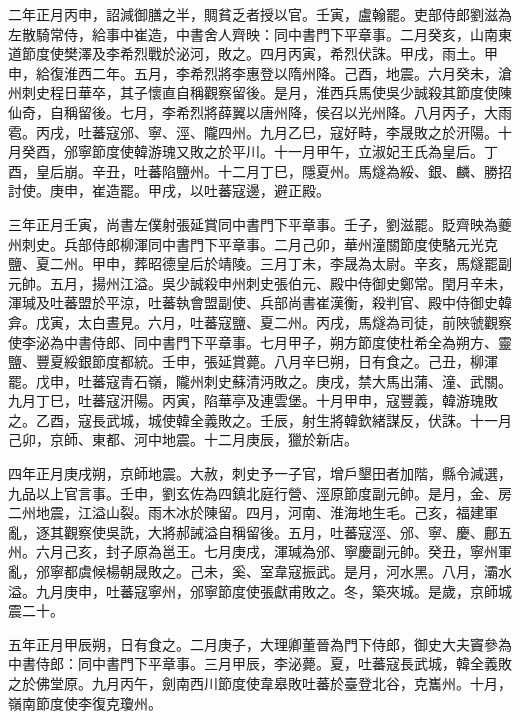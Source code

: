\begin{pinyinscope}
 二年正月丙申，詔減御膳之半，賙貧乏者授以官。壬寅，盧翰罷。吏部侍郎劉滋為左散騎常侍，給事中崔造，中書舍人齊映：同中書門下平章事。二月癸亥，山南東道節度使樊澤及李希烈戰於泌河，敗之。四月丙寅，希烈伏誅。甲戌，雨土。甲申，給復淮西二年。五月，李希烈將李惠登以隋州降。己酉，地震。六月癸未，滄州刺史程日華卒，其子懷直自稱觀察留後。是月，淮西兵馬使吳少誠殺其節度使陳仙奇，自稱留後。七月，李希烈將薛翼以唐州降，侯召以光州降。八月丙子，大雨雹。丙戌，吐蕃寇邠、寧、涇、隴四州。九月乙巳，寇好畤，李晟敗之於汧陽。十月癸酉，邠寧節度使韓游瑰又敗之於平川。十一月甲午，立淑妃王氏為皇后。丁酉，皇后崩。辛丑，吐蕃陷鹽州。十二月丁巳，隱夏州。馬燧為綏、銀、麟、勝招討使。庚申，崔造罷。甲戌，以吐蕃寇邊，避正殿。



 三年正月壬寅，尚書左僕射張延賞同中書門下平章事。壬子，劉滋罷。貶齊映為夔州刺史。兵部侍郎柳渾同中書門下平章事。二月己卯，華州潼關節度使駱元光克鹽、夏二州。甲申，葬昭德皇后於靖陵。三月丁未，李晟為太尉。辛亥，馬燧罷副元帥。五月，揚州江溢。吳少誠殺申州刺史張伯元、殿中侍御史鄭常。閏月辛未，渾瑊及吐蕃盟於平涼，吐蕃執會盟副使、兵部尚書崔漢衡，殺判官、殿中侍御史韓弇。戊寅，太白晝見。六月，吐蕃寇鹽、夏二州。丙戌，馬燧為司徒，前陜虢觀察使李泌為中書侍郎、同中書門下平章事。七月甲子，朔方節度使杜希全為朔方、靈鹽、豐夏綏銀節度都統。壬申，張延賞薨。八月辛巳朔，日有食之。己丑，柳渾罷。戊申，吐蕃寇青石嶺，隴州刺史蘇清沔敗之。庚戌，禁大馬出蒲、潼、武關。九月丁巳，吐蕃寇汧陽。丙寅，陷華亭及連雲堡。十月甲申，寇豐義，韓游瑰敗之。乙酉，寇長武城，城使韓全義敗之。壬辰，射生將韓欽緒謀反，伏誅。十一月己卯，京師、東都、河中地震。十二月庚辰，獵於新店。



 四年正月庚戌朔，京師地震。大赦，刺史予一子官，增戶墾田者加階，縣令減選，九品以上官言事。壬申，劉玄佐為四鎮北庭行營、涇原節度副元帥。是月，金、房二州地震，江溢山裂。雨木冰於陳留。四月，河南、淮海地生毛。己亥，福建軍亂，逐其觀察使吳詵，大將郝誡溢自稱留後。五月，吐蕃寇涇、邠、寧、慶、鄜五州。六月己亥，封子原為邕王。七月庚戌，渾瑊為邠、寧慶副元帥。癸丑，寧州軍亂，邠寧都虞候楊朝晟敗之。己未，奚、室韋寇振武。是月，河水黑。八月，灞水溢。九月庚申，吐蕃寇寧州，邠寧節度使張獻甫敗之。冬，築夾城。是歲，京師城震二十。



 五年正月甲辰朔，日有食之。二月庚子，大理卿董晉為門下侍郎，御史大夫竇參為中書侍郎：同中書門下平章事。三月甲辰，李泌薨。夏，吐蕃寇長武城，韓全義敗之於佛堂原。九月丙午，劍南西川節度使韋皋敗吐蕃於臺登北谷，克巂州。十月，嶺南節度使李復克瓊州。




\end{pinyinscope}
